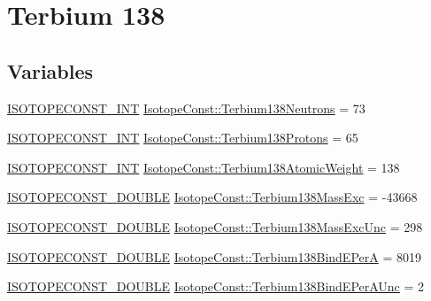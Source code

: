 \hypertarget{group___isotope_const-_terbium-_tb138}{}\section{Terbium 138}
\label{group___isotope_const-_terbium-_tb138}
\subsection*{Variables}
\begin{DoxyCompactItemize}
\item 
\mbox{\hyperlink{group___isotope_const-_macros_ga5f18360b3e99483a35c32d789e62621c}{I\+S\+O\+T\+O\+P\+E\+C\+O\+N\+S\+T\+\_\+\+I\+NT}} \mbox{\hyperlink{group___isotope_const-_terbium-_tb138_ga2ddeddfd125303ab9a96bd43be565cbd}{Isotope\+Const\+::\+Terbium138\+Neutrons}} = 73
\item 
\mbox{\hyperlink{group___isotope_const-_macros_ga5f18360b3e99483a35c32d789e62621c}{I\+S\+O\+T\+O\+P\+E\+C\+O\+N\+S\+T\+\_\+\+I\+NT}} \mbox{\hyperlink{group___isotope_const-_terbium-_tb138_gafba5a2f4599c44076f4601f0d9f9bc52}{Isotope\+Const\+::\+Terbium138\+Protons}} = 65
\item 
\mbox{\hyperlink{group___isotope_const-_macros_ga5f18360b3e99483a35c32d789e62621c}{I\+S\+O\+T\+O\+P\+E\+C\+O\+N\+S\+T\+\_\+\+I\+NT}} \mbox{\hyperlink{group___isotope_const-_terbium-_tb138_ga76f741d8319a9c7415a7545434fb9217}{Isotope\+Const\+::\+Terbium138\+Atomic\+Weight}} = 138
\item 
\mbox{\hyperlink{group___isotope_const-_macros_ga8f45a7272ce02c0b4c65c44636ed719a}{I\+S\+O\+T\+O\+P\+E\+C\+O\+N\+S\+T\+\_\+\+D\+O\+U\+B\+LE}} \mbox{\hyperlink{group___isotope_const-_terbium-_tb138_gad0fa1f919fd189046ab484974555ba9d}{Isotope\+Const\+::\+Terbium138\+Mass\+Exc}} = -\/43668
\item 
\mbox{\hyperlink{group___isotope_const-_macros_ga8f45a7272ce02c0b4c65c44636ed719a}{I\+S\+O\+T\+O\+P\+E\+C\+O\+N\+S\+T\+\_\+\+D\+O\+U\+B\+LE}} \mbox{\hyperlink{group___isotope_const-_terbium-_tb138_gac397b9901fe95b0243c72d5563f61546}{Isotope\+Const\+::\+Terbium138\+Mass\+Exc\+Unc}} = 298
\item 
\mbox{\hyperlink{group___isotope_const-_macros_ga8f45a7272ce02c0b4c65c44636ed719a}{I\+S\+O\+T\+O\+P\+E\+C\+O\+N\+S\+T\+\_\+\+D\+O\+U\+B\+LE}} \mbox{\hyperlink{group___isotope_const-_terbium-_tb138_gae6219f3cb4dfa6562f892b8ece836409}{Isotope\+Const\+::\+Terbium138\+Bind\+E\+PerA}} = 8019
\item 
\mbox{\hyperlink{group___isotope_const-_macros_ga8f45a7272ce02c0b4c65c44636ed719a}{I\+S\+O\+T\+O\+P\+E\+C\+O\+N\+S\+T\+\_\+\+D\+O\+U\+B\+LE}} \mbox{\hyperlink{group___isotope_const-_terbium-_tb138_ga9fbf11612f47721b8108f5b2c42f8f88}{Isotope\+Const\+::\+Terbium138\+Bind\+E\+Per\+A\+Unc}} = 2

\end{DoxyCompactItemize}
